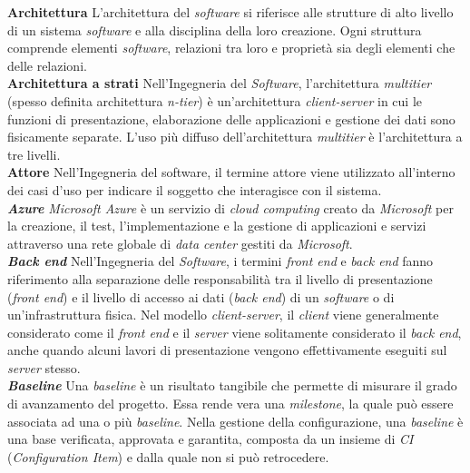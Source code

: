 \textbf{Architettura} L'architettura del \textit{software} si riferisce alle strutture di alto livello di un sistema \textit{software} e alla disciplina della loro creazione. Ogni struttura comprende elementi \textit{software}, relazioni tra loro e proprietà sia degli elementi che delle relazioni. \\

\textbf{Architettura a strati} Nell'Ingegneria del \textit{Software}, l'architettura \textit{multitier} (spesso definita architettura \textit{n-tier}) è un'architettura \textit{client-server} in cui le funzioni di presentazione, elaborazione delle applicazioni e gestione dei dati sono fisicamente separate. L'uso più diffuso dell'architettura \textit{multitier} è l'architettura a tre livelli. \\

\textbf{Attore} Nell'Ingegneria del software, il termine attore viene utilizzato all'interno dei casi d'uso per indicare il
soggetto che interagisce con il sistema. \\

\textbf{\textit{Azure}} \textit{Microsoft Azure} è un servizio di \textit{cloud computing} creato da \textit{Microsoft} per la creazione, il test, l'implementazione e la gestione di applicazioni e servizi attraverso una rete globale di \textit{data center} gestiti da \textit{Microsoft}. \\

\textbf{\textit{Back end}} Nell'Ingegneria del \textit{Software}, i termini \textit{front end} e \textit{back end} fanno riferimento alla separazione delle responsabilità tra il livello di presentazione (\textit{front end}) e il livello di accesso ai dati (\textit{back end}) di un \textit{software} o di un'infrastruttura fisica. Nel modello \textit{client-server}, il \textit{client} viene generalmente considerato come il \textit{front end} e il \textit{server} viene solitamente considerato il \textit{back end}, anche quando alcuni lavori di presentazione vengono effettivamente eseguiti sul \textit{server} stesso.\\

\textbf{\textit{Baseline}} Una \textit{baseline} è un risultato tangibile che permette di misurare il grado di avanzamento del progetto. Essa rende vera una \textit{milestone}, la quale può essere associata ad una o più \textit{baseline}. Nella gestione della configurazione, una \textit{baseline} è una base verificata, approvata e garantita, composta da un insieme di \textit{CI} (\textit{Configuration Item}) e dalla quale non si può retrocedere.\\

